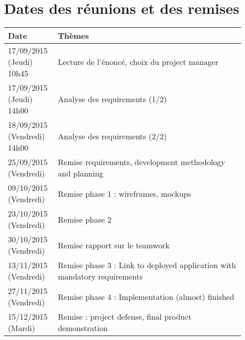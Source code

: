 \section{Dates des réunions et des remises}

\begin{tabular}{|p{0.2\linewidth}|p{0.75\linewidth}|}
    \hline
    Date & Thèmes \\
    \hline
    \hline
    17/09/2015 (Jeudi) 10h45 & Lecture de l'énoncé, choix du project
    manager \\
    \hline
    17/09/2015 (Jeudi) 14h00 & Analyse des requirements (1/2) \\
    \hline
    18/09/2015 (Vendredi) 14h00 & Analyse des requirements (2/2) \\
    \hline
    25/09/2015 (Vendredi) & Remise requirements, development methodology
    and planning \\
    \hline
    09/10/2015 (Vendredi) & Remise phase 1 : wireframes, mockups \\
    \hline
    23/10/2015 (Vendredi) & Remise phase 2 \\
    \hline
    30/10/2015 (Vendredi) & Remise rapport sur le teamwork \\
    \hline
    13/11/2015 (Vendredi) & Remise phase 3 : Link to deployed
    application with mandatory requirements \\
    \hline
    27/11/2015 (Vendredi) & Remise phase 4 : Implementation (almost)
    finished \\
    \hline
    15/12/2015 (Mardi) & Remise : project defense, final product
    demonstration \\
    \hline
\end{tabular}
